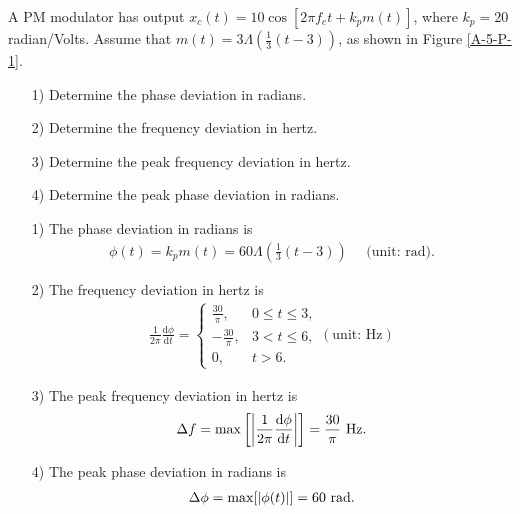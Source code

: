 \documentclass{assignment}
\begin{document}
\begin{prob}
    A PM modulator has output $x_c(t)=10\cos[2\pi f_ct+k_pm(t)]$, where $k_p=20$ radian/Volts. Assume that $m(t)=3\Lambda\left(\frac{1}{3}(t-3)\right)$, as shown in Figure \ref{A-5-P-1}.
    \begin{itemize}
        \item[1)] Determine the phase deviation in radians.
        \item[2)] Determine the frequency deviation in hertz.
        \item[3)] Determine the peak frequency deviation in hertz.
        \item[4)] Determine the peak phase deviation in radians.
    \end{itemize}
\end{prob}
\begin{sol}
    \begin{itemize}
        \item[1)] The phase deviation in radians is
        \begin{align}
            \phi(t)=k_pm(t)=60\Lambda\left(\frac{1}{3}(t-3)\right)\quad\text{ (unit: rad)}.
        \end{align}
        \item[2)] The frequency deviation in hertz is
        \begin{align}
            \frac{1}{2\pi}\frac{\mathrm{d}\phi}{\mathrm{d}t}=\left\{\begin{array}{ll}
                \frac{30}{\pi},&0\leq t\leq 3,\\
                -\frac{30}{\pi},&3< t\leq 6,\\
                0,&t>6.
            \end{array}\right.(\text{unit: Hz})
        \end{align}
        \item[3)] The peak frequency deviation in hertz is
        \begin{align}
            \Delta f=\max\left[\left\lvert\frac{1}{2\pi}\frac{\mathrm{d}\phi}{\mathrm{d}t}\right\rvert\right]=\frac{30}{\pi}\text{ Hz}.
        \end{align}
        \item[4)] The peak phase deviation in radians is
        \begin{align}
            \Delta\phi=\max[\left\lvert\phi(t)\right\rvert]=60\text{ rad}.
        \end{align}
    \end{itemize}
\end{sol}
\end{document}

